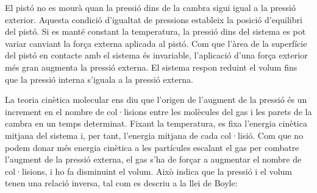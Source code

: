 \begin{mybox}[title=Amortidors]
\begin{center}
  \end{center}
    
    El pistó no es mourà quan la pressió dins de la cambra sigui igual a la pressió exterior. Aquesta condició d'igualtat de pressions estableix la posició d'equilibri del pistó. Si es manté constant la temperatura, la pressió dins del sistema es pot variar canviant la força externa aplicada al pistó. Com que l'àrea de la superfície del pistó en contacte amb el sistema és invariable, l'aplicació d'una força exterior més gran augmenta la pressió externa. El sistema respon reduint el volum fins que la pressió interna s'iguala a la pressió externa.
    
    La teoria cinètica molecular ens diu que l'origen de l'augment de la pressió és un increment en el nombre de col·lisions entre les molècules del gas i les parets de la cambra en un temps determinat. Fixant la temperatura, es fixa l'energia cinètica mitjana del sistema i, per tant, l'energia mitjana de cada col·lisió. Com que no podem donar més energia cinètica a les partícules escalant el gas per combatre l'augment de la pressió externa, el gas s'ha de forçar a augmentar el nombre de col·lisions, i ho fa disminuint el volum. Això indica que la pressió i el volum tenen una relació inversa, tal com es descriu a la llei de Boyle:
    

\end{mybox}

